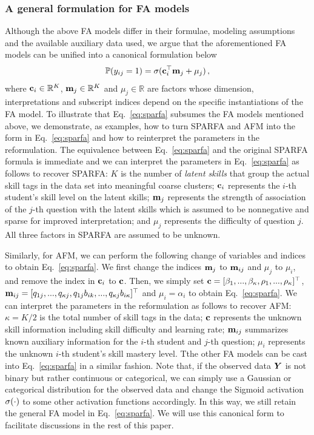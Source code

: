 \documentclass{edm_article}
\begin{document}
\subsubsection{A general formulation for FA models}
Although the above FA models differ in their formulae, modeling assumptions and the available auxiliary data used, we argue that the aforementioned FA models can be unified into a canonical formulation below 
\begin{align}
    \begin{split}
        \mathbb{P}(y_{ij}=1) = \sigma({\mathbf{c}}_i^\top {\mathbf{m}}_j + \mu_j)\,, \label{eq:sparfa}
    \end{split}
\end{align}
where ${\mathbf{c}}_i\in\mathbb{R}^K$, ${\mathbf{m}}_j\in\mathbb{R}^K$ and $\mu_j\in\mathbb{R}$ are factors whose dimension, interpretations and subscript indices depend on the specific instantiations of the FA model. To illustrate that Eq.~\ref{eq:sparfa} subsumes the FA models mentioned above, we demonstrate, as examples, how to turn SPARFA and AFM into the form in Eq.~\ref{eq:sparfa} and how to reinterpret the parameters in the reformulation. The equivalence between Eq.~\ref{eq:sparfa} and the original SPARFA formula is immediate and we can interpret the parameters in Eq.~\ref{eq:sparfa} as follows to recover SPARFA: $K$ is the number of \textit{latent skills} that group the actual skill tags in the data set into meaningful coarse clusters; ${\mathbf{c}}_i$ represents the $i$-th student's skill level on the latent skills; ${\mathbf{m}}_j$ represents the strength of association of the $j$-th question with the latent skills which is assumed to be nonnegative and sparse for improved interpretation; and $\mu_j$ represents the difficulty of question $j$. All three factors in SPARFA are assumed to be unknown.

Similarly, for AFM, we can perform the following change of variables and indices to obtain Eq.~\ref{eq:sparfa}. We first change the indices ${\mathbf{m}}_j$ to ${\mathbf{m}}_{ij}$ and $\mu_j$ to $\mu_i$, and remove the index in ${\mathbf{c}}_i$ to ${\mathbf{c}}$. Then, we simply set ${\mathbf{c}} = [\beta_1, ..., \beta_\kappa, \rho_1, ..., \rho_\kappa]^\top$, ${\mathbf{m}}_{ij} = [q_{1j},...,q_{\kappa j}, q_{1j}b_{ik},...,q_{\kappa j}b_{i\kappa}]^\top$ and $\mu_{i} = \alpha_i$ to obtain Eq.~\ref{eq:sparfa}. We can interpret the parameters in the reformulation as follows to recover AFM: $\kappa=K/2$ is the total number of skill tags in the data; ${\mathbf{c}}$ represents the unknown skill information including skill difficulty and learning rate; ${\mathbf{m}}_{ij}$ summarizes known auxiliary information for the $i$-th student and $j$-th question; $\mu_i$ represents the unknown $i$-th student's skill mastery level. Tthe other FA models can be cast into Eq.~\ref{eq:sparfa} in a similar fashion. Note that, if the observed data ${\bm{Y}}$ is not binary but rather continuous or categorical, we can simply use a Gaussian or categorical distribution for the observed data and change the Sigmoid activation $\sigma(\cdot)$ to some other activation functions accordingly. In this way, we still retain the general FA model in Eq.~\ref{eq:sparfa}. We will use this canonical form to facilitate discussions in the rest of this paper.
\end{document}
